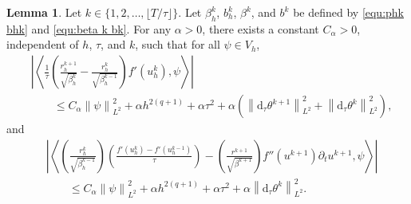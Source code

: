 \documentclass[11pt, reqno]{amsart}
\theoremstyle{definition}
\newtheorem{lemma}[theorem]{Lemma}
\numberwithin{equation}{section}
\newcommand{\dtt}{\mathrm{d}_\tau}
\newcommand{\norm}[2]{\left\|{#1}\right\|_{#2}}
\newcommand{\inpro}[2]{\left\langle#1,#2\right\rangle}
\newcommand{\abs}[1]{\left|{#1}\right|}
\begin{document}

\begin{lemma}
	Let $k\in\{1,2,\ldots,\lfloor T/\tau\rfloor\}$. Let $\beta_h^k$, $b_h^k$, $\beta^k$, and $b^k$ be defined by \eqref{equ:phk bhk} and \eqref{equ:beta k bk}. For any $\alpha>0$, there exists a constant $C_\alpha>0$, independent of $h$, $\tau$, and $k$, such that for all $\psi\in V_h$,
	\begin{align}
		\label{equ:pre est N5}
		&\abs{
			\inpro{
				\frac{1}{\tau}
				\left(
				\frac{r_h^{k+1}}{\sqrt{\beta_h^k}}
				-
				\frac{r_h^k}{\sqrt{\beta_h^{k-1}}}
				\right)
				f'(u_h^k)
			}{\psi}}
		\nonumber\\
		&\qquad
		\leq
		C_\alpha\norm{\psi}{L^2}^2
		+
		\alpha h^{2(q+1)}
		+
		\alpha \tau^2
		+
		\alpha\left(
		\norm{\dtt\theta^{k+1}}{L^2}^2
		+
		\norm{\dtt\theta^k}{L^2}^2
		\right),
	\end{align}
	and
	\begin{align}
		\label{equ:pre est N6}
		&\abs{
			\inpro{
				\left(\frac{r_h^k}{\sqrt{\beta_h^{k-1}}}\right)
				\left(
				\frac{f'(u_h^k)-f'(u_h^{k-1})}{\tau}
				\right)
				-
				\left(
				\frac{r^{k+1}}{\sqrt{\beta^{k+1}}}
				\right)
				f''(u^{k+1})\partial_t u^{k+1}
			}{\psi}}
		\nonumber\\
		&\qquad
		\leq
		C_\alpha \norm{\psi}{L^2}^2
		+
		\alpha h^{2(q+1)}
		+
		\alpha \tau^2
		+
		\alpha\norm{\dtt\theta^k}{L^2}^2.
	\end{align}
\end{lemma}
\end{document}
